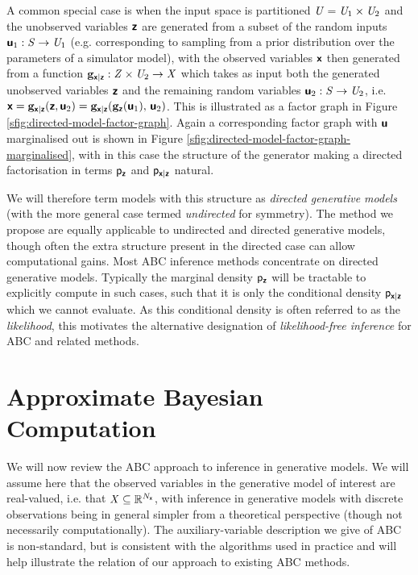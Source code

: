 A common special case is when the input space is partitioned $\mathit{U} = \mathit{U}_1 \times \mathit{U}_2$ and the unobserved variables $\boldsymbol{\mathsf{z}}$ are generated from a subset of the random inputs $\boldsymbol{\mathsf{u}}_1 : \mathit{S} \to \mathit{U}_1$ (e.g. corresponding to sampling from a prior distribution over the parameters of a simulator model), with the observed variables $\boldsymbol{\mathsf{x}}$ then generated from a function ${\mathbf{g}}_{\boldsymbol{\mathsf{x}}|\boldsymbol{\mathsf{z}}} : \mathit{Z} \times \mathit{U}_2 \to \mathit{X}$ which takes as input both the generated unobserved variables $\boldsymbol{\mathsf{z}}$ and the remaining random variables $\boldsymbol{\mathsf{u}}_2 : \mathit{S} \to \mathit{U}_2$, i.e. $\rvct{x} = \genfunc_{\rvct{x}|\rvct{z}}(\rvct{z},\rvct{u}_2) = \genfunc_{\rvct{x}|\rvct{z}}\lpa\genfunc_{\rvct{z}}(\rvct{u}_1),\,\rvct{u}_2\rpa$. This is illustrated as a factor graph in Figure \ref{sfig:directed-model-factor-graph}. Again a corresponding factor graph with $\boldsymbol{\mathsf{u}}$ marginalised out is shown in Figure \ref{sfig:directed-model-factor-graph-marginalised}, with in this case the structure of the generator making a directed factorisation in terms $\mathsf{p}_{\boldsymbol{\mathsf{z}}}$ and $\mathsf{p}_{\boldsymbol{\mathsf{x}}|\boldsymbol{\mathsf{z}}}$ natural. 

We will therefore term models with this structure as \emph{directed generative models} (with the more general case termed \emph{undirected} for symmetry). 
The method we propose are equally applicable to undirected and directed generative models, though often the extra structure present in the directed case can allow computational gains. Most \ac{ABC} inference methods concentrate on directed generative models. Typically the marginal density $\mathsf{p}_{\boldsymbol{\mathsf{z}}}$ will be tractable to explicitly compute in such cases, such that it is only the conditional density $\mathsf{p}_{\boldsymbol{\mathsf{x}}|\boldsymbol{\mathsf{z}}}$ which we cannot evaluate. As this conditional density is often referred to as the \emph{likelihood}, this motivates the alternative designation of \emph{likelihood-free inference} for \ac{ABC} and related methods.


\section{Approximate Bayesian Computation}\label{sec:abc}

We will now review the \ac{ABC} approach to inference in generative models. We will assume here that the observed variables in the generative model of interest are real-valued, i.e. that $\mathit{X} \subseteq \mathbb{R}^{N_{\boldsymbol{\mathsf{x}}}}$, with inference in generative models with discrete observations being in general simpler from a theoretical perspective (though not necessarily computationally). The auxiliary-variable description we give of \ac{ABC} is non-standard, but is consistent with the algorithms used in practice and will help illustrate the relation of our approach to existing \ac{ABC} methods.

